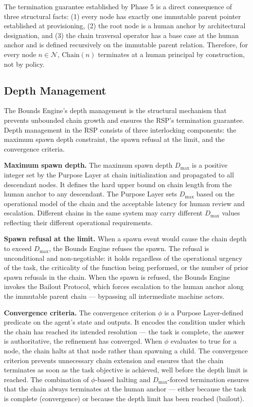 The termination guarantee established by Phase 5 is a direct consequence of three structural facts: (1) every node has exactly one immutable parent pointer established at provisioning, (2) the root node is a human anchor by architectural designation, and (3) the chain traversal operator has a base case at the human anchor and is defined recursively on the immutable parent relation. Therefore, for every node $n \in \mathcal{N}$, $\mathrm{Chain}(n)$ terminates at a human principal by construction, not by policy.

\subsection{Depth Management}

The Bounds Engine's depth management is the structural mechanism that prevents unbounded chain growth and ensures the RSP's termination guarantee. Depth management in the RSP consists of three interlocking components: the maximum spawn depth constraint, the spawn refusal at the limit, and the convergence criteria.

\textbf{Maximum spawn depth.} The maximum spawn depth $D_{\max}$ is a positive integer set by the Purpose Layer at chain initialization and propagated to all descendant nodes. It defines the hard upper bound on chain length from the human anchor to any descendant. The Purpose Layer sets $D_{\max}$ based on the operational model of the chain and the acceptable latency for human review and escalation. Different chains in the same \bxthree{} system may carry different $D_{\max}$ values reflecting their different operational requirements.

\textbf{Spawn refusal at the limit.} When a spawn event would cause the chain depth to exceed $D_{\max}$, the Bounds Engine refuses the spawn. The refusal is unconditional and non-negotiable: it holds regardless of the operational urgency of the task, the criticality of the function being performed, or the number of prior spawn refusals in the chain. When the spawn is refused, the Bounds Engine invokes the Bailout Protocol, which forces escalation to the human anchor along the immutable parent chain — bypassing all intermediate machine actors.

\textbf{Convergence criteria.} The convergence criterion $\phi$ is a Purpose Layer-defined predicate on the agent's state and outputs. It encodes the condition under which the chain has reached its intended resolution — the task is complete, the answer is authoritative, the refinement has converged. When $\phi$ evaluates to true for a node, the chain halts at that node rather than spawning a child. The convergence criterion prevents unnecessary chain extension and ensures that the chain terminates as soon as the task objective is achieved, well before the depth limit is reached. The combination of $\phi$-based halting and $D_{\max}$-forced termination ensures that the chain always terminates at the human anchor — either because the task is complete (convergence) or because the depth limit has been reached (bailout).


